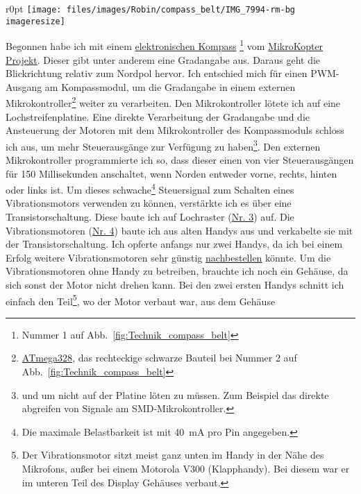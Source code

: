 \begin{wrapfigure}{r}{0pt}
	\texttt{[image: files/images/Robin/compass\_belt/IMG\_7994-rm-bg\\imageresize]}
	\label{fig:Technik_compass_belt}
\end{wrapfigure}

Begonnen habe ich mit einem
\href{http://www.mikrokopter.de/ucwiki/MK3Mag}{elektronischen Kompass}%
\footnote{Nummer 1 auf Abb.~\vref{fig:Technik_compass_belt}}
vom \href{http://www.mikrokopter.de}{MikroKopter Projekt}.
Dieser gibt unter anderem eine Gradangabe aus. Daraus geht die Blickrichtung relativ zum Nordpol
hervor. Ich entschied mich für einen PWM-Ausgang am Kompassmodul, um die Gradangabe in einem
externen Mikrokontroller\footnote{\href{http://www.atmel.com/Images/doc8161.pdf}{ATmega328}, das
rechteckige schwarze Bauteil bei Nummer 2 auf Abb.~\vref{fig:Technik_compass_belt}}
weiter zu verarbeiten. Den Mikrokontroller lötete ich auf eine
Lochstreifenplatine. Eine direkte Verarbeitung der Gradangabe und die Ansteuerung der Motoren mit
dem Mikrokontroller des Kompassmoduls schloss ich aus, um mehr Steuerausgänge zur Verfügung zu
haben\footnote{und um nicht auf der Platine löten zu müssen. Zum Beispiel das direkte abgreifen
von Signale am SMD-Mikrokontroller.}.
Den externen Mikrokontroller programmierte ich so, dass dieser einen von vier Steuerausgängen
für 150 Millisekunden anschaltet, wenn Norden entweder vorne, rechts, hinten oder links ist.
Um dieses schwache\footnote{Die maximale Belastbarkeit ist mit \SI{40}{\milli\ampere} pro Pin
angegeben.}
Steuersignal zum Schalten eines Vibrationsmotors verwenden zu können, verstärkte ich es über eine
Transistorschaltung. Diese baute ich auf Lochraster (\hyperref[fig:Technik_compass_belt]{Nr. 3})
auf. Die Vibrationsmotoren (\hyperref[fig:Technik_compass_belt]{Nr. 4}) baute ich aus alten
Handys
aus und verkabelte sie mit der Transistorschaltung. Ich opferte anfangs nur zwei Handys, da ich
bei einem Erfolg weitere Vibrationsmotoren sehr günstig
\href{http://www.pollin.de/shop/dt/NDA2OTg2OTk-/Motoren/%
Gleichstrommotoren/Vibrationsmotor_LA4_432A.html}{nachbestellen}
könnte.
Um die Vibrationsmotoren ohne Handy zu betreiben, brauchte ich noch ein Gehäuse, da sich sonst der Motor
nicht drehen kann. Bei den zwei ersten Handys schnitt ich einfach den Teil\footnote{Der Vibrationsmotor
sitzt meist ganz unten im Handy in der Nähe des Mikrofons, außer bei einem Motorola V300 (Klapphandy). Bei
diesem war er im unteren Teil des Display Gehäuses verbaut.}, wo der Motor verbaut war, aus dem Gehäuse
